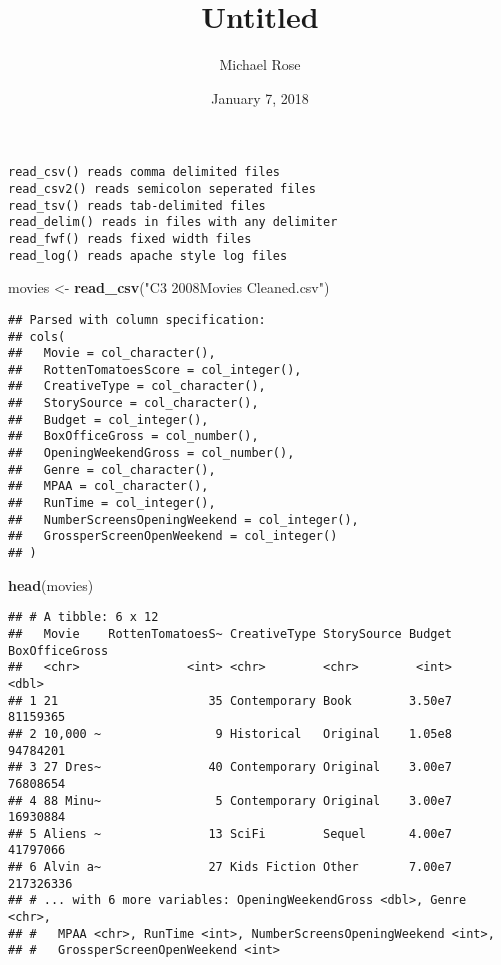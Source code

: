 \documentclass[]{article}
\title{Untitled}
\author{Michael Rose}
\date{January 7, 2018}
\newenvironment{Shaded}{\begin{snugshade}}{\end{snugshade}}
\newcommand{\KeywordTok}[1]{\textcolor[rgb]{0.13,0.29,0.53}{\textbf{#1}}}
\newcommand{\StringTok}[1]{\textcolor[rgb]{0.31,0.60,0.02}{#1}}
\newcommand{\NormalTok}[1]{#1}
\begin{document}
\maketitle

\begin{verbatim}
read_csv() reads comma delimited files
read_csv2() reads semicolon seperated files 
read_tsv() reads tab-delimited files
read_delim() reads in files with any delimiter
read_fwf() reads fixed width files
read_log() reads apache style log files 
\end{verbatim}

\begin{Shaded}
\begin{Highlighting}[]
\NormalTok{movies <-}\StringTok{ }\KeywordTok{read_csv}\NormalTok{(}\StringTok{"C3 2008Movies Cleaned.csv"}\NormalTok{)}
\end{Highlighting}
\end{Shaded}

\begin{verbatim}
## Parsed with column specification:
## cols(
##   Movie = col_character(),
##   RottenTomatoesScore = col_integer(),
##   CreativeType = col_character(),
##   StorySource = col_character(),
##   Budget = col_integer(),
##   BoxOfficeGross = col_number(),
##   OpeningWeekendGross = col_number(),
##   Genre = col_character(),
##   MPAA = col_character(),
##   RunTime = col_integer(),
##   NumberScreensOpeningWeekend = col_integer(),
##   GrossperScreenOpenWeekend = col_integer()
## )
\end{verbatim}

\begin{Shaded}
\begin{Highlighting}[]
\KeywordTok{head}\NormalTok{(movies)}
\end{Highlighting}
\end{Shaded}

\begin{verbatim}
## # A tibble: 6 x 12
##   Movie    RottenTomatoesS~ CreativeType StorySource Budget BoxOfficeGross
##   <chr>               <int> <chr>        <chr>        <int>          <dbl>
## 1 21                     35 Contemporary Book        3.50e7       81159365
## 2 10,000 ~                9 Historical   Original    1.05e8       94784201
## 3 27 Dres~               40 Contemporary Original    3.00e7       76808654
## 4 88 Minu~                5 Contemporary Original    3.00e7       16930884
## 5 Aliens ~               13 SciFi        Sequel      4.00e7       41797066
## 6 Alvin a~               27 Kids Fiction Other       7.00e7      217326336
## # ... with 6 more variables: OpeningWeekendGross <dbl>, Genre <chr>,
## #   MPAA <chr>, RunTime <int>, NumberScreensOpeningWeekend <int>,
## #   GrossperScreenOpenWeekend <int>
\end{verbatim}
\end{document}
